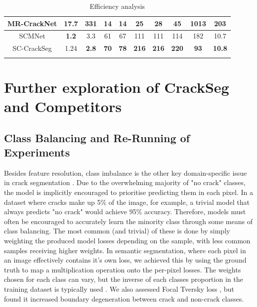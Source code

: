 \documentclass[a4paper,12pt]{report}
\begin{document}
\begin{table}
\begin{adjustbox}{width=\columnwidth,center}
\begin{tabular}{|c|c|c|c|c|c|c|c|c|c|}
            \hline
            {MR-CrackNet} & {17.7}       & {331}        & {14}                                                           & {14}        & {25}         & {28}         & {45}         & {1013}                                                   & {203}         \\
            \hline
            {SCMNet}      & \textbf{1.2} & {3.3}        & {61}                                                           & {67}        & {111}        & {111}        & {114}        & {182}                                                    & {10.7}        \\
            \hline
            {SC-CrackSeg} & {1.24}       & \textbf{2.8} & \textbf{70}                                                    & \textbf{78} & \textbf{216} & \textbf{216} & \textbf{220} & \textbf{93}                                              & \textbf{10.8} \\
            \hline
            \multicolumn{10}{l}{}
        \end{tabular}
    \end{adjustbox}
    \caption{Efficiency analysis}\label{tab6}
\end{table}


\section{Further exploration of CrackSeg and Competitors} %
\subsection{Class Balancing and Re-Running of Experiments}
Besides feature resolution, class imbalance is the other key domain-specific issue in crack segmentation \cite{hamishebahar_comprehensive_2022}. Due to the overwhelming majority of "no crack" classes, the model is implicitly encouraged to prioritise predicting them in each pixel. In a dataset where cracks make up 5\% of the image, for example, a trivial model that always predicts "no crack" would achieve 95\% accuracy. Therefore, models must often be encouraged to accurately learn the minority class through some means of class balancing. The most common (and trivial) of these is done by simply weighting the produced model losses depending on the sample, with less common samples receiving higher weights. In semantic segmentation, where each pixel in an image effectively contains it's own loss, we achieved this by using the ground truth to map a multiplication operation onto the per-pixel losses. The weights chosen for each class can vary, but the inverse of each classes proportion in the training dataset is typically used \cite{kochkarev_data_2020}. We also assessed Focal Tversky loss \cite{abraham_novel_2018}, but found it increased boundary degeneration between crack and non-crack classes.
\end{document}
